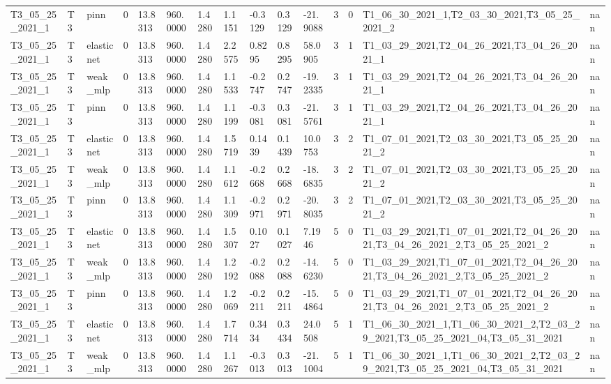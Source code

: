\begin{table}[t]
\begin{tabular}{lllllllllllllll}
T3\_05\_25\_2021\_1 & T3 & pinn & 0 & 13.8313 & 960.0000 & 1.4280 & 1.1151 & -0.3129 & 0.3129 & -21.9088 & 3 & 0 & T1\_06\_30\_2021\_1,T2\_03\_30\_2021,T3\_05\_25\_2021\_2 & nan \\
T3\_05\_25\_2021\_1 & T3 & elasticnet & 0 & 13.8313 & 960.0000 & 1.4280 & 2.2575 & 0.8295 & 0.8295 & 58.0905 & 3 & 1 & T1\_03\_29\_2021,T2\_04\_26\_2021,T3\_04\_26\_2021\_1 & nan \\
T3\_05\_25\_2021\_1 & T3 & weak\_mlp & 0 & 13.8313 & 960.0000 & 1.4280 & 1.1533 & -0.2747 & 0.2747 & -19.2335 & 3 & 1 & T1\_03\_29\_2021,T2\_04\_26\_2021,T3\_04\_26\_2021\_1 & nan \\
T3\_05\_25\_2021\_1 & T3 & pinn & 0 & 13.8313 & 960.0000 & 1.4280 & 1.1199 & -0.3081 & 0.3081 & -21.5761 & 3 & 1 & T1\_03\_29\_2021,T2\_04\_26\_2021,T3\_04\_26\_2021\_1 & nan \\
T3\_05\_25\_2021\_1 & T3 & elasticnet & 0 & 13.8313 & 960.0000 & 1.4280 & 1.5719 & 0.1439 & 0.1439 & 10.0753 & 3 & 2 & T1\_07\_01\_2021,T2\_03\_30\_2021,T3\_05\_25\_2021\_2 & nan \\
T3\_05\_25\_2021\_1 & T3 & weak\_mlp & 0 & 13.8313 & 960.0000 & 1.4280 & 1.1612 & -0.2668 & 0.2668 & -18.6835 & 3 & 2 & T1\_07\_01\_2021,T2\_03\_30\_2021,T3\_05\_25\_2021\_2 & nan \\
T3\_05\_25\_2021\_1 & T3 & pinn & 0 & 13.8313 & 960.0000 & 1.4280 & 1.1309 & -0.2971 & 0.2971 & -20.8035 & 3 & 2 & T1\_07\_01\_2021,T2\_03\_30\_2021,T3\_05\_25\_2021\_2 & nan \\
T3\_05\_25\_2021\_1 & T3 & elasticnet & 0 & 13.8313 & 960.0000 & 1.4280 & 1.5307 & 0.1027 & 0.1027 & 7.1946 & 5 & 0 & T1\_03\_29\_2021,T1\_07\_01\_2021,T2\_04\_26\_2021,T3\_04\_26\_2021\_2,T3\_05\_25\_2021\_2 & nan \\
T3\_05\_25\_2021\_1 & T3 & weak\_mlp & 0 & 13.8313 & 960.0000 & 1.4280 & 1.2192 & -0.2088 & 0.2088 & -14.6230 & 5 & 0 & T1\_03\_29\_2021,T1\_07\_01\_2021,T2\_04\_26\_2021,T3\_04\_26\_2021\_2,T3\_05\_25\_2021\_2 & nan \\
T3\_05\_25\_2021\_1 & T3 & pinn & 0 & 13.8313 & 960.0000 & 1.4280 & 1.2069 & -0.2211 & 0.2211 & -15.4864 & 5 & 0 & T1\_03\_29\_2021,T1\_07\_01\_2021,T2\_04\_26\_2021,T3\_04\_26\_2021\_2,T3\_05\_25\_2021\_2 & nan \\
T3\_05\_25\_2021\_1 & T3 & elasticnet & 0 & 13.8313 & 960.0000 & 1.4280 & 1.7714 & 0.3434 & 0.3434 & 24.0508 & 5 & 1 & T1\_06\_30\_2021\_1,T1\_06\_30\_2021\_2,T2\_03\_29\_2021,T3\_05\_25\_2021\_04,T3\_05\_31\_2021 & nan \\
T3\_05\_25\_2021\_1 & T3 & weak\_mlp & 0 & 13.8313 & 960.0000 & 1.4280 & 1.1267 & -0.3013 & 0.3013 & -21.1004 & 5 & 1 & T1\_06\_30\_2021\_1,T1\_06\_30\_2021\_2,T2\_03\_29\_2021,T3\_05\_25\_2021\_04,T3\_05\_31\_2021 & nan \\

\end{tabular}
\end{table}
